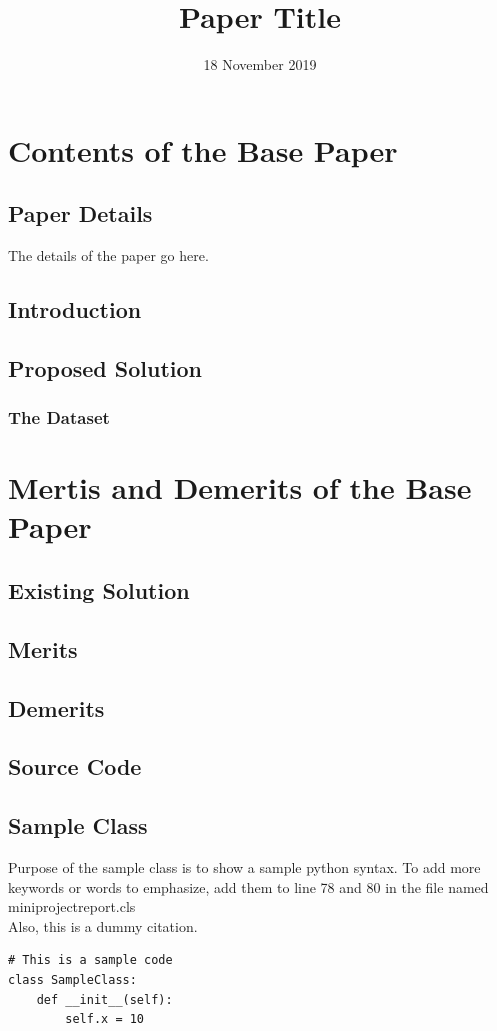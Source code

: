 \documentclass{miniprojectreport}
\title{Paper Title}
\date{18 November 2019}
\begin{document}
	\makeminireportfirstpage
	\bonafide
	\acknowledgement{\lipsum[1]}
	\newpage
	\tableofcontents
	\newpage
	\setcounter{page}{1}
	\chapter{Contents of the Base Paper}
		\setcounter{chapter}{1}
		\section{Paper Details}
		The details of the paper go here.
		\section{Introduction}
		\lipsum[3]
		\section{Proposed Solution}
		\lipsum[4]
		\subsection{The Dataset}
		\lipsum[5]
	\chapter{Mertis and Demerits of the Base Paper}
		\section{Existing Solution}
		\lipsum[6]
		\section{Merits}
		\lipsum[7]
		\section{Demerits}
		\lipsum[8]
	\begin{hyphenatedcode}
	\chapter{Source Code}
	\section{Sample Class}
	Purpose of the sample class is to show a sample python syntax. To add more keywords or words to emphasize, add them to line 78 and 80 in the file named miniprojectreport.cls\\Also, this\cite{7457930} is a dummy citation.\\
\begin{lstlisting}
# This is a sample code
class SampleClass:
    def __init__(self):
        self.x = 10	
\end{lstlisting}
	\end{hyphenatedcode}
	\newpage
\end{document}
